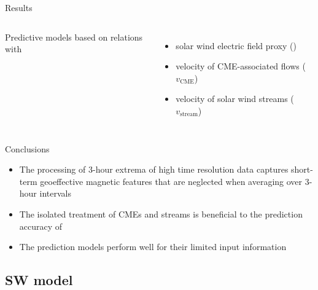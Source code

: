 \begin{frame}[c]{Results}{}
	\begin{columns}[c]
	\column{\textwidth}
		
		Predictive \Kp{} models based on relations with
		\begin{itemize}%
			\item solar wind electric field proxy (\vBz{})
			\item velocity of CME-associated flows ($v_\text{CME}$)
			\item velocity of solar wind streams ($v_\text{stream}$)
		\end{itemize}
		
	\end{columns}
\end{frame}
\begin{frame}[c]{Conclusions}{}
		
		\begin{itemize}%
			\item The processing of 3-hour extrema of high time resolution data captures short-term geoeffective magnetic features that are neglected when averaging over 3-hour intervals
			\item The isolated treatment of CMEs and streams is beneficial to the prediction accuracy of \Kp{}
			\item The prediction models perform well for their limited input information
		\end{itemize}
		
	
	\vspace*{\fill} \hfill \hyperlink{prediction_performance}{}
\end{frame}


\subsection{SW model}

